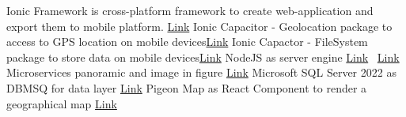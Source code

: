 \documentclass[conference]{IEEEtran}
\begin{document}
\begin{thebibliography}{00}
 Ionic Framework is cross-platform framework to create web-application and export them to mobile platform. \href{http://www.overleaf.com}{Link}
 Ionic Capacitor - Geolocation package to access to GPS location on mobile devices\href{https://capacitorjs.com/docs/apis/geolocation}{Link}
Ionic Capactor - FileSystem package to store data on mobile devices\href{https://capacitorjs.com/docs/apis/filesystem}{Link}
 NodeJS as server engine \href{https://nodejs.org/en}{Link}\
 \href{https://tediousjs.github.io/tedious/}{Link}
\bibitem{b6} Microservices panoramic and image in figure \href{https://medium.com/the-modern-scientist/introduction-to-microservices-architecture-f0c7eefe79f1}{Link}
\bibitem{b7} Microsoft SQL Server 2022 as DBMSQ for data layer \href{https://www.microsoft.com/en-us/sql-server/sql-server-2022}{Link}
\bibitem{b8} Pigeon Map as React Component to render a geographical map \href{https://pigeon-maps.js.org/}{Link}


\end{thebibliography}
\vspace{12pt}
\end{document}
